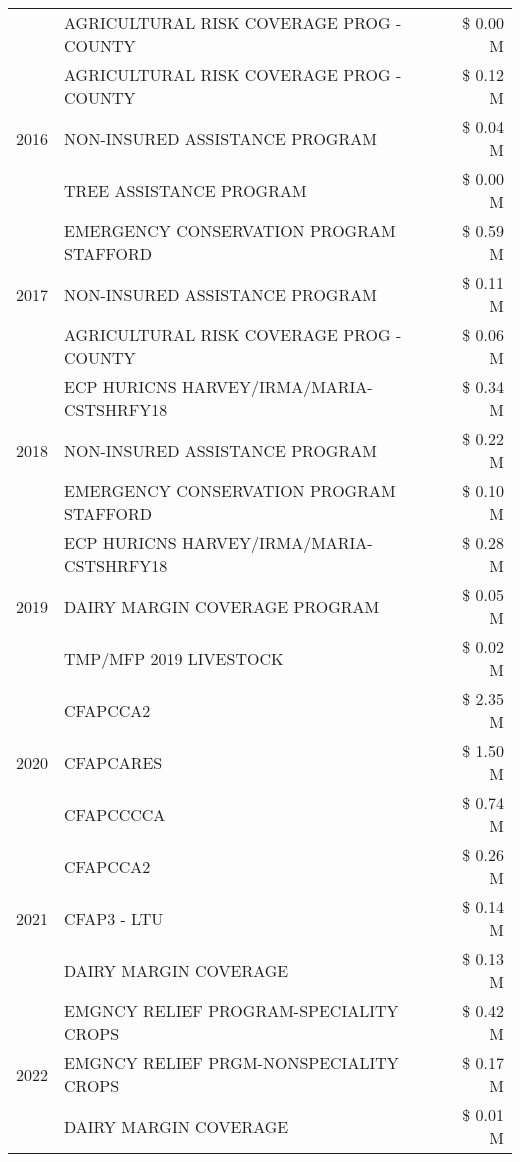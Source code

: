 \begin{tabular}{llr}
 & AGRICULTURAL RISK COVERAGE PROG - COUNTY & \$ 0.00 M \\
\cline{1-3}
\multirow[t]{3}{*}{2016} & AGRICULTURAL RISK COVERAGE PROG - COUNTY & \$ 0.12 M \\
 & NON-INSURED ASSISTANCE PROGRAM & \$ 0.04 M \\
 & TREE ASSISTANCE PROGRAM & \$ 0.00 M \\
\cline{1-3}
\multirow[t]{3}{*}{2017} & EMERGENCY CONSERVATION PROGRAM STAFFORD & \$ 0.59 M \\
 & NON-INSURED ASSISTANCE PROGRAM & \$ 0.11 M \\
 & AGRICULTURAL RISK COVERAGE PROG - COUNTY & \$ 0.06 M \\
\cline{1-3}
\multirow[t]{3}{*}{2018} & ECP HURICNS HARVEY/IRMA/MARIA-CSTSHRFY18 & \$ 0.34 M \\
 & NON-INSURED ASSISTANCE PROGRAM & \$ 0.22 M \\
 & EMERGENCY CONSERVATION PROGRAM STAFFORD & \$ 0.10 M \\
\cline{1-3}
\multirow[t]{3}{*}{2019} & ECP HURICNS HARVEY/IRMA/MARIA-CSTSHRFY18 & \$ 0.28 M \\
 & DAIRY MARGIN COVERAGE PROGRAM & \$ 0.05 M \\
 & TMP/MFP 2019 LIVESTOCK & \$ 0.02 M \\
\cline{1-3}
\multirow[t]{3}{*}{2020} & CFAPCCA2 & \$ 2.35 M \\
 & CFAPCARES & \$ 1.50 M \\
 & CFAPCCCCA & \$ 0.74 M \\
\cline{1-3}
\multirow[t]{3}{*}{2021} & CFAPCCA2 & \$ 0.26 M \\
 & CFAP3 - LTU & \$ 0.14 M \\
 & DAIRY MARGIN COVERAGE & \$ 0.13 M \\
\cline{1-3}
\multirow[t]{3}{*}{2022} & EMGNCY RELIEF PROGRAM-SPECIALITY CROPS & \$ 0.42 M \\
 & EMGNCY RELIEF PRGM-NONSPECIALITY CROPS & \$ 0.17 M \\
 & DAIRY MARGIN COVERAGE & \$ 0.01 M \\
\cline{1-3}
\bottomrule
\end{tabular}
